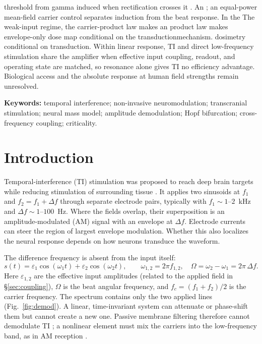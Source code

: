 \documentclass[11pt,a4paper]{article}
\providecommand{\DIFaddtex}[1]{{\protect\color{blue} \sf #1}} %
\providecommand{\DIFdeltex}[1]{{\protect\color{red} \scriptsize #1}} %
\providecommand{\DIFaddbegin}{} %
\providecommand{\DIFaddend}{} %
\providecommand{\DIFdelbegin}{} %
\providecommand{\DIFdelend}{} %
\providecommand{\DIFadd}[1]{\texorpdfstring{\DIFaddtex{#1}}{#1}} %
\providecommand{\DIFdel}[1]{\texorpdfstring{\DIFdeltex{#1}}{}} %
\begin{document}
threshold from gamma induced when rectification crosses it\DIFdelbegin \DIFdel{. An }\DIFdelend \DIFaddbegin \DIFadd{; an }\DIFaddend equal-power
mean-field carrier control separates induction from the beat response.
\DIFdelbegin \DIFdel{In the }\DIFdelend \DIFaddbegin \DIFadd{The }\DIFaddend weak-input \DIFdelbegin \DIFdel{regime, the carrier-product
law makes an }\DIFdelend \DIFaddbegin \DIFadd{product law makes }\DIFaddend envelope-only \DIFdelbegin \DIFdel{dose map conditional on
the transductionmechanism. }\DIFdelend \DIFaddbegin \DIFadd{dosimetry conditional on
transduction. Within linear response, }\DIFaddend TI and direct low-frequency stimulation
share the amplifier when \DIFdelbegin \DIFdel{effective input }\DIFdelend coupling, readout, and \DIFdelbegin \DIFdel{operating }\DIFdelend state are matched, so resonance
alone gives TI no efficiency advantage.
\DIFdelbegin \DIFdel{Biological access and the absolute response at human field strengths remain
unresolved.
}\DIFdelend \fi

\smallskip
\noindent\textbf{Keywords:} temporal interference; non-invasive neuromodulation;
transcranial stimulation; neural mass model; amplitude demodulation; Hopf bifurcation;
cross-frequency coupling; criticality.

\clearpage
\tableofcontents
\clearpage

\section{Introduction}
Temporal-interference (TI) stimulation was proposed to reach deep brain targets while
reducing stimulation of surrounding tissue \cite{grossman2017}. It applies two sinusoids at
$f_1$ and $f_2=f_1+\Delta f$ through separate electrode pairs, typically with
$f_1\sim1$--$2$~kHz and $\Delta f\sim1$--$100$~Hz. Where the fields overlap, their
superposition is an amplitude-modulated (AM) signal with an envelope at $\Delta f$.
Electrode currents can steer the region of largest envelope modulation. Whether this
also localizes the neural response depends on how neurons transduce the waveform.

The difference frequency is absent from the input itself:
\begin{equation}
s(t)=\varepsilon_1\cos(\omega_1 t)+\varepsilon_2\cos(\omega_2 t),\qquad
\omega_{1,2}=2\pi f_{1,2},\quad \Omega=\omega_2-\omega_1=2\pi\,\Delta f .
\label{eq:am}
\end{equation}
Here $\varepsilon_{1,2}$ are the effective input amplitudes (related to the applied field
in \S\ref{sec:coupling}), $\Omega$ is the beat angular frequency, and
$f_c=(f_1+f_2)/2$ is the carrier frequency. The spectrum contains only the two applied
lines (Fig.~\ref{fig:demod}). A linear, time-invariant system can attenuate or phase-shift
them but cannot create a new one. Passive membrane filtering therefore cannot
demodulate TI \cite{mirzakhalili2020}; a nonlinear element must mix the carriers into
the low-frequency band, as in AM reception \cite{nahin2001}.
\end{document}
